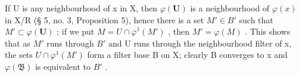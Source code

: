 If U is any neighbourhood of x in X, then \(\varphi(\mathbf{U})\) is a neighbourhood of \(\varphi(x)\) in X/R (§ 5, no. 3, Proposition 5), hence there is a set \(M' \in B'\) such that \(M' \subset \varphi(\mathbf{U})\) ; if we put \(M = U \cap \overline{\varphi}^{1}(M')\) , then \(M' = \varphi(M)\) . This shows that as \(M'\) runs through \(B'\) and U runs through the neighbourhood filter of x, the sets \(U \cap \overline{\varphi}^{1}(M')\) form a filter base B on X; clearly B converges to x and \(\varphi(\mathfrak{B})\) is equivalent to \(B'\) .

